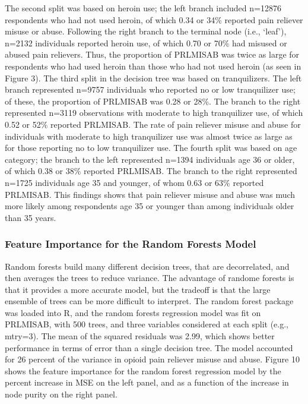 \documentclass[sigconf]{acmart}
\begin{document}

The second split was based on heroin use; the left branch included n=12876 
respondents who had not used heroin, of which 0.34 or 34\% reported pain
reliever misuse or abuse. Following the right branch to the terminal node 
(i.e., `leaf'), n=2132 individuals reported heroin use, of which 0.70 or 
70\% had misused or abused pain relievers. Thus, the proportion of PRLMISAB 
was twice as large for respondents who had used heroin than those who had 
not used heroin (as seen in Figure 3). The third split in the decision tree
was based on tranquilizers. The left branch represented n=9757 individuals 
who reported no or low tranquilizer use; of these, the proportion of 
PRLMISAB was 0.28 or 28\%. The branch to the right represented n=3119 
observations with moderate to high tranquilizer use, of which 0.52 or 52\% 
reported PRLMISAB. The rate of pain reliever misuse and abuse for individuals 
with moderate to high tranquilizer use was almost twice as large as for 
those reporting no to low tranquilizer use. The fourth split was based on age 
category; the branch to the left represented n=1394 individuals age 36 or older, 
of which 0.38 or 38\% reported PRLMISAB. The branch to the right represented 
n=1725 individuals age 35 and younger, of whom 0.63 or 63\% reported PRLMISAB. 
This findings shows that pain reliever misuse and abuse was much more likely
among respondents age 35 or younger than among individuals older than 35 years. 



\subsubsection{Feature Importance for the Random Forests Model}


Random forests build many different decision trees, that are decorrelated, and 
then averages the trees to reduce variance. The advantage of randome forests is 
that it provides a more accurate model, but the tradeoff is that the large 
ensemble of trees can be more difficult to interpret. The random forest package 
was loaded into R, and the random forests regression model was fit on PRLMISAB, 
with 500 trees, and three variables considered at each split (e.g., mtry=3).
The mean of the squared residuals was 2.99, which shows better performance
in terms of error than a single decision tree. The model accounted for 26
percent of the variance in opioid pain reliever misuse and abuse. Figure 10
shows the feature importance for the random forest regression model by the
percent increase in MSE on the left panel, and as a function of the increase
in node purity on the right panel. 
\end{document}
